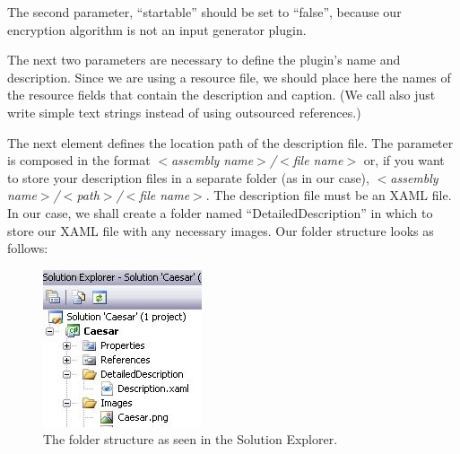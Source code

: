 The second parameter, ``startable'' should be set to ``false'', because our encryption algorithm is not an input generator plugin.


The next two parameters are necessary to define the plugin's name and description. Since we are using a resource file, we should place here the names of the resource fields that contain the description and caption.  (We call also just write simple text strings instead of using outsourced references.)


The next element defines the location path of the description file. The parameter is composed in the format \textit{$<$assembly name$>$/$<$file name$>$} or, if you want to store your description files in a separate folder (as in our case), \textit{$<$assembly name$>$/$<$path$>$/$<$file name$>$}. The description file must be an XAML file. In our case, we shall create a folder named ``DetailedDescription'' in which to store our XAML file with any necessary images. Our folder structure looks as follows:

\begin{figure}[h!]
	\centering
		\includegraphics[width=.30\textwidth]{figures/attribute_plugininfo_detailed_descr_path.jpg}
	\caption{The folder structure as seen in the Solution Explorer.}
	\label{fig:attribute_plugininfo_icon_path}
\end{figure}



